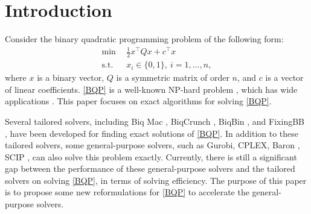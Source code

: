 \documentclass[pdflatex,sn-mathphys-num]{sn-jnl}%
\theoremstyle{thmstyleone}%
\theoremstyle{thmstyletwo}%
\theoremstyle{thmstylethree}%
\begin{document}



\maketitle


\section{Introduction}

Consider the binary quadratic programming problem of the following form:
\begin{equation}\label{BQP}\tag{BQP}
	\begin{aligned}
		\min ~&~ \frac{1}{2}x^\top Q x+ c^\top x \\
		\text{s.t.} ~&~ x_i \in \{0,1\},~i=1,\ldots,n,
	\end{aligned}
\end{equation}
where $x$ is a binary vector, $Q$ is a symmetric matrix of order $n$, and $c$ is a vector of linear coefficients. \eqref{BQP} is a well-known NP-hard problem \cite{Garey}, which has wide applications \cite{BQP}. This paper focuses on exact algorithms for solving \eqref{BQP}.

Several tailored solvers, including Biq Mac \cite{Rendl}, BiqCrunch \cite{Krislock,BiqCrunch}, BiqBin \cite{BiqBin}, and FixingBB \cite{Locatelli2024}, have been developed for finding exact solutions of \eqref{BQP}. In addition to these tailored solvers, some general-purpose solvers, such as Gurobi, CPLEX, Baron \cite{Sahinidis,Tawarmalani}, SCIP \cite{Bestuzheva2025,Vigerske}, can also solve this problem exactly. Currently, there is still a significant gap between the performance of these general-purpose solvers and the tailored solvers on solving \eqref{BQP}, in terms of solving efficiency. The purpose of this paper is to propose some new reformulations for \eqref{BQP} to accelerate the general-purpose solvers.
\end{document}
